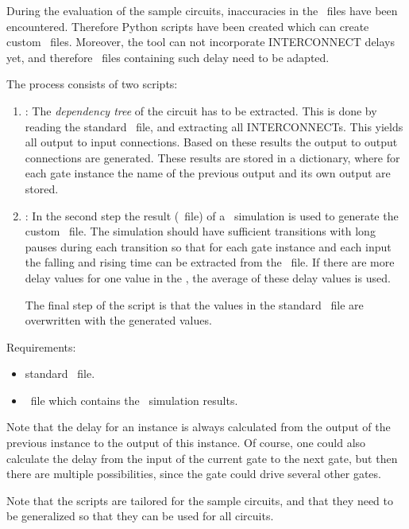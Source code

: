 During the evaluation of the sample circuits, inaccuracies in the \sdffile\ 
files have been encountered. 
Therefore Python scripts have been created which can create custom \sdffile\ 
files. 
Moreover, the tool can not incorporate INTERCONNECT delays yet, and therefore 
\sdffile\ files containing such delay need to be adapted.

The process consists of two scripts:
\begin{enumerate}
	\item {}: The \emph{dependency tree} of the 
	circuit has to be extracted. 
	This is done by reading the standard \sdffile\ file, and extracting all 
	INTERCONNECTs. 
	This yields all output to input connections. 
	Based on these results the output to output connections are generated. 
	These results are stored in a dictionary, where for each gate instance the 
	name of the previous output and its own output are stored.
	\item \file{extractSdf.py}: In the second step the result (\vcdfile\ file) 
	of a \spice\ simulation is used to generate the custom \sdffile\ file. 
	The simulation should have sufficient transitions with long pauses during 
	each transition so that for each gate instance and each input the falling 
	and rising time can be extracted from the \vcdfile\ file. 
	If there are more delay values for one value in the \sdffile, the average 
	of these delay values is used.
	
	The final step of the script is that the values in the standard \sdffile\ 
	file are overwritten with the generated values. 
\end{enumerate}

Requirements:
\begin{itemize}
	\item standard \sdffile\ file.
	\item \vcdfile\ file which contains the \spice\ simulation results.
\end{itemize}

Note that the delay for an instance is always calculated from the output of the 
previous instance to the output of this instance. Of course, one could also 
calculate the delay from the input of the current gate to the next gate, but 
then there are multiple possibilities, since the gate could drive several other 
gates.

Note that the scripts are tailored for the sample circuits, and that they need 
to be generalized so that they can be used for all circuits.